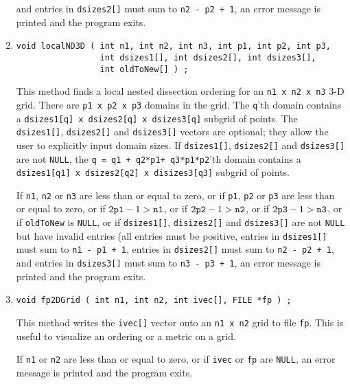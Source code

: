 \begin{enumerate}
and
entries in {\tt dsizes2[]} must sum to {\tt n2 - p2 + 1},
an error message is printed and the program exits.
\item
\begin{verbatim}
void localND3D ( int n1, int n2, int n3, int p1, int p2, int p3,
                 int dsizes1[], int dsizes2[], int dsizes3[],
                 int oldToNew[] ) ;
\end{verbatim}
This method finds a local nested dissection ordering 
\cite{bha93-localND} for an {\tt n1 x n2 x n3} 3-D grid.
There are {\tt p1 x p2 x p3} domains in the grid.
The {\tt q}'th domain contains a
{\tt dsizes1[q] x dsizes2[q] x dsizes3[q]} 
subgrid of points.
The {\tt dsizes1[]}, {\tt dsizes2[]} and {\tt dsizes3[]} vectors 
are optional;
they allow the user to explicitly input domain sizes.
If {\tt dsizes1[]}, {\tt dsizes2[]} and {\tt dsizes3[]} 
are not {\tt NULL},
the {\tt q = q1 + q2*p1+ q3*p1*p2}'th domain contains a
{\tt dsizes1[q1] x dsizes2[q2] x disizes3[q3]} subgrid of points.
\par {}
If {\tt n1}, {\tt n2} or {\tt n3} are less than or equal to zero,
or if {\tt p1}, {\tt p2} or {\tt p3} are less than or equal to zero,
or if $2{\tt p1} - 1 > {\tt n1}$,
or if $2{\tt p2} - 1 > {\tt n2}$,
or if $2{\tt p3} - 1 > {\tt n3}$,
or if {\tt oldToNew} is {\tt NULL},
or if {\tt dsizes1[]}, {\tt disizes2[]} and {\tt dsizes3[]} 
are not {\tt NULL} 
but have invalid entries (all entries must be positive, 
entries in {\tt dsizes1[]} must sum to {\tt n1 - p1 + 1},
entries in {\tt dsizes2[]} must sum to {\tt n2 - p2 + 1},
and
entries in {\tt dsizes3[]} must sum to {\tt n3 - p3 + 1},
an error message is printed and the program exits.
\item
\begin{verbatim}
void fp2DGrid ( int n1, int n2, int ivec[], FILE *fp ) ;
\end{verbatim}
This method writes the {\tt ivec[]} vector onto an {\tt n1 x n2}
grid to file {\tt fp}.
This is useful to visualize an ordering or a metric on a grid.
\par {}
If {\tt n1} or {\tt n2} are less than or equal to zero,
or if {\tt ivec} or {\tt fp} are {\tt NULL},
an error message is printed and the program exits.

\end{enumerate}

